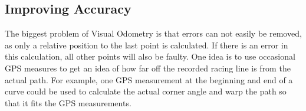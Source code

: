 \subsection{Improving Accuracy}
The biggest problem of Visual Odometry is that errors can not easily be removed, as only a relative position to the last point is calculated. If there is an error in this calculation, all other points will also be faulty. One idea is to use occasional GPS measures to get an idea of how far off the recorded racing line is from the actual path. For example, one GPS measurement at the beginning and end of a curve could be used to calculate the actual corner angle and warp the path so that it fits the GPS measurements. 

\clearpage